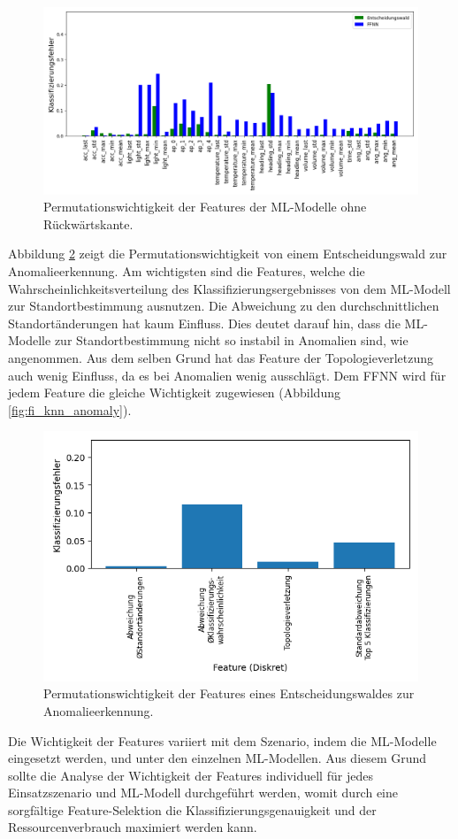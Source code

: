 \begin{figure}[h!]
    \centering
    \includegraphics[width=\linewidth]{images/fi_consolidated_wo_fb.png}
    \caption{Permutationswichtigkeit der Features der ML-Modelle ohne Rückwärtskante.}
    \label{fig:fi_consolidated_wo_fb}
\end{figure}
\newline
\newline
Abbildung \ref{fig:feature_significance_dt_anomaly} zeigt die Permutationswichtigkeit von einem Entscheidungswald zur Anomalieerkennung.
Am wichtigsten sind die Features, welche die Wahrscheinlichkeitsverteilung des Klassifizierungsergebnisses von dem ML-Modell zur Standortbestimmung ausnutzen.
Die Abweichung zu den durchschnittlichen Standortänderungen hat kaum Einfluss.
Dies deutet darauf hin, dass die ML-Modelle zur Standortbestimmung nicht so instabil in Anomalien sind, wie angenommen.
Aus dem selben Grund hat das Feature der Topologieverletzung auch wenig Einfluss, da es bei Anomalien wenig ausschlägt.
Dem FFNN wird für jedem Feature die gleiche Wichtigkeit zugewiesen (Abbildung \ref{fig:fi_knn_anomaly}).
\begin{figure}[h!]
    \centering
    \includegraphics[width=0.65\linewidth]{images/fi_anomaly_dt.png}
    \caption{Permutationswichtigkeit der Features eines Entscheidungswaldes zur Anomalieerkennung.}
    \label{fig:feature_significance_dt_anomaly}
\end{figure}
\newline
\newline
Die Wichtigkeit der Features variiert mit dem Szenario, indem die ML-Modelle eingesetzt werden, und unter den einzelnen ML-Modellen.
Aus diesem Grund sollte die Analyse der Wichtigkeit der Features individuell für jedes Einsatzszenario und ML-Modell durchgeführt werden,
womit durch eine sorgfältige Feature-Selektion die Klassifizierungsgenauigkeit und der Ressourcenverbrauch maximiert werden kann.